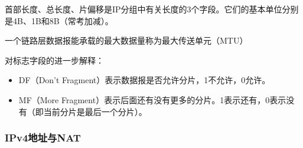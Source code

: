 \documentclass[12pt, a4paper, oneside]{ctexart}
\begin{document}
首部长度、总长度、片偏移是IP分组中有关长度的3个字段。它们的基本单位分别是4B、1B和8B（常考加减）。

一个链路层数据报能承载的最大数据量称为最大传送单元（MTU）

对标志字段的进一步解释：
\begin{itemize}
    \item DF（Don't Fragment）表示数据报是否允许分片，1不允许，0允许。
    \item MF（More Fragment）表示后面还有没有更多的分片。1表示还有，0表示没有（即当前分片是最后一个分片）。
\end{itemize}

\subsubsection{IPv4地址与NAT}
\end{document}
